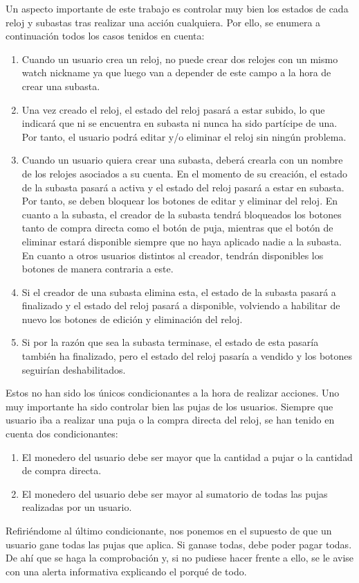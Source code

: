 	Un aspecto importante de este trabajo es controlar muy bien los estados de cada reloj y subastas tras realizar una acción cualquiera. Por ello, se enumera a continuación todos los casos tenidos en cuenta:
	\begin{enumerate}
		\item Cuando un usuario crea un reloj, no puede crear dos relojes con un mismo watch nickname ya que luego van a depender de este campo a la hora de crear una subasta.
		\item Una vez creado el reloj, el estado del reloj pasará a estar subido, lo que indicará que ni se encuentra en subasta ni nunca ha sido partícipe de una. Por tanto, el usuario podrá editar y/o eliminar el reloj sin ningún problema.
		\item Cuando un usuario quiera crear una subasta, deberá crearla con un nombre de los relojes asociados a su cuenta. En el momento de su creación, el estado de la subasta pasará a activa y el estado del reloj pasará a estar en subasta. Por tanto, se deben bloquear los botones de editar y eliminar del reloj. En cuanto a la subasta, el creador de la subasta tendrá bloqueados los botones tanto de compra directa como el botón de puja, mientras que el botón de eliminar estará disponible siempre que no haya aplicado nadie a la subasta. En cuanto a otros usuarios distintos al creador, tendrán disponibles los botones de manera contraria a este.
		\item Si el creador de una subasta elimina esta, el estado de la subasta pasará a finalizado y el estado del reloj pasará a disponible, volviendo a habilitar de nuevo los botones de edición y eliminación del reloj.
		\item Si por la razón que sea la subasta terminase, el estado de esta pasaría también ha finalizado, pero el estado del reloj pasaría a vendido y los botones seguirían deshabilitados.
	\end{enumerate}
	
	Estos no han sido los únicos condicionantes a la hora de realizar acciones. Uno muy importante ha sido controlar bien las pujas de los usuarios. Siempre que usuario iba a realizar una puja o la compra directa del reloj, se han tenido en cuenta dos condicionantes:
	\begin{enumerate}
		\item El monedero del usuario debe ser mayor que la cantidad a pujar o la cantidad de compra directa.
		\item El monedero del usuario debe ser mayor al sumatorio de todas las pujas realizadas por un usuario.
	\end{enumerate}
	
	Refiriéndome al último condicionante, nos ponemos en el supuesto de que un usuario gane todas las pujas que aplica. Si ganase todas, debe poder pagar todas. De ahí que se haga la comprobación y, si no pudiese hacer frente a ello, se le avise con una alerta informativa explicando el porqué de todo.
